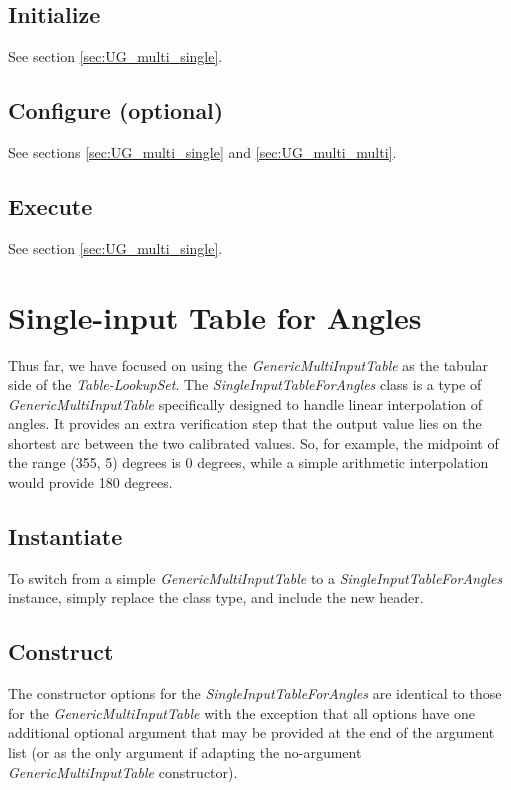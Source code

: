\documentclass[11pt,fleqn]{report}
\begin{document}
\subsection{Initialize}
See section \ref{sec:UG_multi_single}.

\subsection{Configure (optional)}
See sections \ref{sec:UG_multi_single} and \ref{sec:UG_multi_multi}.

\subsection {Execute}
See section \ref{sec:UG_multi_single}.

\section{Single-input Table for Angles}\label{sec:UG_angles}
Thus far, we have focused on using the \textit{GenericMultiInputTable} as the
tabular side of the \textit{Table-LookupSet}.  The
\textit{SingleInputTableForAngles} class is a type of
\textit{GenericMultiInputTable} specifically designed to handle linear
interpolation of angles.  It provides an extra verification step that the
output value lies on the shortest arc between the two calibrated values. So,
for example, the midpoint of the range (355, 5) degrees is 0 degrees, while a
simple arithmetic interpolation would provide 180 degrees.

\subsection{Instantiate}
To switch from a simple \textit{GenericMultiInputTable} to a
\textit{SingleInputTableForAngles} instance, simply replace the class type,
and include the new header.

\subsection{Construct}
The constructor options for the \textit{SingleInputTableForAngles} are
identical to those for the \textit{GenericMultiInputTable} with the exception
that all options have one additional optional argument that may be provided
at the end of the argument list (or as the only argument if adapting the
no-argument \textit{GenericMultiInputTable} constructor).
\end{document}
